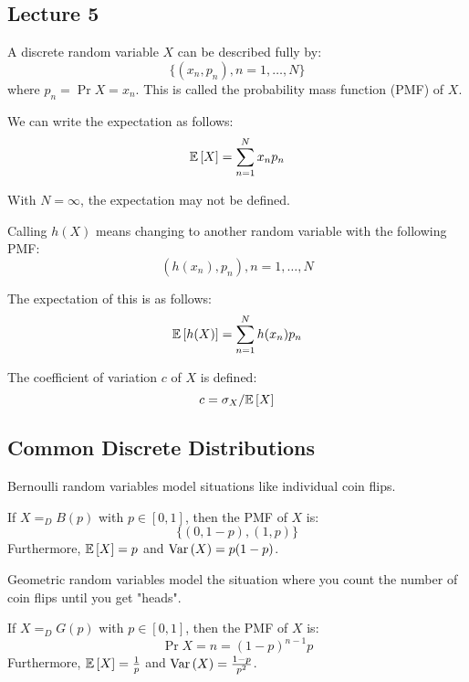 \subsection{Lecture 5}

\begin{definition}
    A discrete random variable $X$ can be described fully by:
    \[ \{ (x_n, p_n), n = 1, \dots, N\} \] 
    where $p_n = \Pr{X = x_n}$. This is called the probability mass function (PMF)
    of $X$.
\end{definition}

We can write the expectation as follows:
\[ \mathbb{E}\left[ X \right] = \sum_{n = 1}^N x_n p_n \]

With $N = \infty$, the expectation may not be defined.

\begin{definition}
    Calling $h(X)$ means changing to another random variable with the following
    PMF:
    \[ (h(x_n), p_n), n = 1, \dots, N \]
\end{definition}

The expectation of this is as follows:
\[ \mathbb{E}\left[ h(X) \right] = \sum_{n = 1}^N h(x_n) p_n \]

\begin{definition}
    The coefficient of variation $c$ of $X$ is defined:
    \[ c = \sigma_X/\mathbb{E}\left[ X \right] \]
\end{definition}

\subsection{Common Discrete Distributions}

Bernoulli random variables model situations like individual coin flips.
\begin{definition}
    If $X =_D B(p)$ with $p \in [0, 1]$,
    then the PMF of $X$ is: \[\{(0, 1 - p), (1, p)\}\]
    Furthermore,
    $\mathbb{E}\left[ X \right] = p$ and $\text{Var}\left( X \right) = p(1-p)$.
\end{definition}

Geometric random variables model the situation where you count
the number of coin flips until you get "heads".
\begin{definition}
    If $X=_D G(p)$ with $p \in [0, 1]$,
    then the PMF of $X$ is:
    \[ \Pr{X = n} = (1 - p)^{n - 1} p \]
    Furthermore,
    $\mathbb{E}\left[ X \right] = \frac{1}{p}$ and $\text{Var}\left( X \right) = \frac{1 - p}{p^2}$.
\end{definition}

